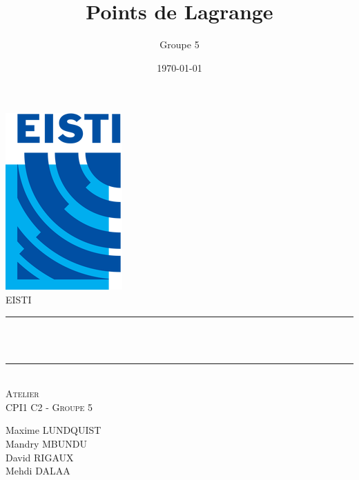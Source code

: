 \documentclass[12pt]{article}
\title{Points de Lagrange}								%
\author{Groupe 5}								%
\date{\today}											%
\makeatletter
\let\thetitle\@title
\let\thedate\@date
\makeatother
\begin{document}

\begin{titlepage}
	\centering
    \vspace*{0.5 cm}
    \includegraphics[scale = 0.75 ]{logo1.png}\\[1.0 cm]	%
    \textsc{\LARGE EISTI}\\[2.0 cm]			%
    \rule{\linewidth}{0.2 mm} \\[0.5 cm]
    { \huge \bfseries \thetitle}\\
    \rule{\linewidth}{0.2 mm} \\[1.5 cm]
	\textsc{\Large Atelier}\\[0.5 cm]	%
	\textsc{\large CPI1 C2 - Groupe 5}\\[0.5 cm]		%
	
	\begin{minipage}{0.4\textwidth}
	\centering
		\begin{center} \large
		Maxime LUNDQUIST \\
		Mandry MBUNDU \\
		David RIGAUX \\
		Mehdi DALAA \\
			\end{center}
			\end{minipage}~
			\begin{minipage}{0.4\textwidth}
	\end{minipage}\\[0.8 cm]
	{\large \thedate}\\[1 cm]
	\vfill
	
\end{titlepage}

\end{document}
